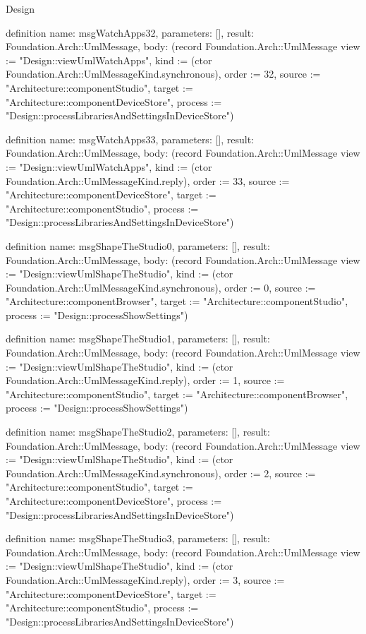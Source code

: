\begin{lexlean}{Design}
\begin{semanticmodule}
definition{
  name: msgWatchApps32,
  parameters: [],
  result: Foundation.Arch::UmlMessage,
  body: (record Foundation.Arch::UmlMessage {view := "Design::viewUmlWatchApps", kind := (ctor Foundation.Arch::UmlMessageKind.synchronous), order := 32, source := "Architecture::componentStudio", target := "Architecture::componentDeviceStore", process := "Design::processLibrariesAndSettingsInDeviceStore"})
}

definition{
  name: msgWatchApps33,
  parameters: [],
  result: Foundation.Arch::UmlMessage,
  body: (record Foundation.Arch::UmlMessage {view := "Design::viewUmlWatchApps", kind := (ctor Foundation.Arch::UmlMessageKind.reply), order := 33, source := "Architecture::componentDeviceStore", target := "Architecture::componentStudio", process := "Design::processLibrariesAndSettingsInDeviceStore"})
}

definition{
  name: msgShapeTheStudio0,
  parameters: [],
  result: Foundation.Arch::UmlMessage,
  body: (record Foundation.Arch::UmlMessage {view := "Design::viewUmlShapeTheStudio", kind := (ctor Foundation.Arch::UmlMessageKind.synchronous), order := 0, source := "Architecture::componentBrowser", target := "Architecture::componentStudio", process := "Design::processShowSettings"})
}

definition{
  name: msgShapeTheStudio1,
  parameters: [],
  result: Foundation.Arch::UmlMessage,
  body: (record Foundation.Arch::UmlMessage {view := "Design::viewUmlShapeTheStudio", kind := (ctor Foundation.Arch::UmlMessageKind.reply), order := 1, source := "Architecture::componentStudio", target := "Architecture::componentBrowser", process := "Design::processShowSettings"})
}

definition{
  name: msgShapeTheStudio2,
  parameters: [],
  result: Foundation.Arch::UmlMessage,
  body: (record Foundation.Arch::UmlMessage {view := "Design::viewUmlShapeTheStudio", kind := (ctor Foundation.Arch::UmlMessageKind.synchronous), order := 2, source := "Architecture::componentStudio", target := "Architecture::componentDeviceStore", process := "Design::processLibrariesAndSettingsInDeviceStore"})
}

definition{
  name: msgShapeTheStudio3,
  parameters: [],
  result: Foundation.Arch::UmlMessage,
  body: (record Foundation.Arch::UmlMessage {view := "Design::viewUmlShapeTheStudio", kind := (ctor Foundation.Arch::UmlMessageKind.reply), order := 3, source := "Architecture::componentDeviceStore", target := "Architecture::componentStudio", process := "Design::processLibrariesAndSettingsInDeviceStore"})
}


\end{semanticmodule}
\end{lexlean}
